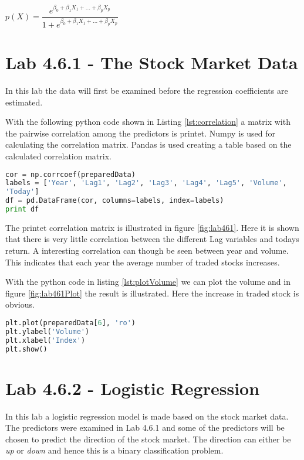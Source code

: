 \begin{center}
	$p(X) = \dfrac{e^{\beta_0 + \beta_1 X_1 + ... + \beta_p X_p}}{1 + e^{\beta_0 + \beta_1 X_1 + ... + \beta_p X_p}}$ 
\end{center}


\section{Lab 4.6.1 - The Stock Market Data}
In this lab the data will first be examined before the regression coefficients are estimated. 

With the following python code shown in Listing \ref{lst:correlation} a matrix with the pairwise correlation among the predictors is printet. Numpy is used for calculating the correlation matrix. Pandas is used creating a table based on the calculated correlation matrix.
\begin{lstlisting}[language=Python, label=lst:correlation, caption=print correlation matrix]
cor = np.corrcoef(preparedData)
labels = ['Year', 'Lag1', 'Lag2', 'Lag3', 'Lag4', 'Lag5', 'Volume', 
'Today']
df = pd.DataFrame(cor, columns=labels, index=labels)
print df
\end{lstlisting}

The printet correlation matrix is illustrated in figure \ref{fig:lab461}. Here it is shown that there is very little correlation between the different Lag variables and todays return. A interesting correlation can though be seen between year and volume. This indicates that each year the average number of traded stocks increases. 

\FloatBarrier

With the python code in listing \ref{lst:plotVolume} we can plot the volume and in figure \ref{fig:lab461Plot} the result is illustrated. Here the increase in traded stock is obvious.
\begin{lstlisting}[language=Python, label=lst:plotVolume, caption=print correlation matrix]
plt.plot(preparedData[6], 'ro')
plt.ylabel('Volume')
plt.xlabel('Index')
plt.show()
\end{lstlisting}


\section{Lab 4.6.2 - Logistic Regression}
In this lab a logistic regression model is made based on the stock market data. The predictors were examined in Lab 4.6.1 and some of the predictors will be chosen to predict the direction of the stock market. The direction can either be \emph{up} or \emph{down} and hence this is a binary classification problem.


